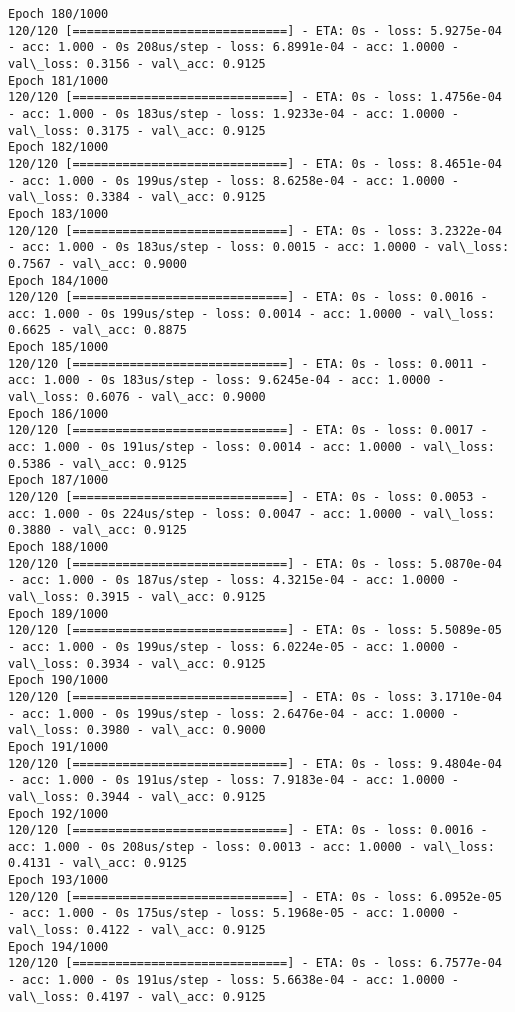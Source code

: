 \documentclass[11pt]{article}
\begin{document}
\begin{Verbatim}[commandchars=\\\{\}]
Epoch 180/1000
120/120 [==============================] - ETA: 0s - loss: 5.9275e-04 - acc: 1.000 - 0s 208us/step - loss: 6.8991e-04 - acc: 1.0000 - val\_loss: 0.3156 - val\_acc: 0.9125
Epoch 181/1000
120/120 [==============================] - ETA: 0s - loss: 1.4756e-04 - acc: 1.000 - 0s 183us/step - loss: 1.9233e-04 - acc: 1.0000 - val\_loss: 0.3175 - val\_acc: 0.9125
Epoch 182/1000
120/120 [==============================] - ETA: 0s - loss: 8.4651e-04 - acc: 1.000 - 0s 199us/step - loss: 8.6258e-04 - acc: 1.0000 - val\_loss: 0.3384 - val\_acc: 0.9125
Epoch 183/1000
120/120 [==============================] - ETA: 0s - loss: 3.2322e-04 - acc: 1.000 - 0s 183us/step - loss: 0.0015 - acc: 1.0000 - val\_loss: 0.7567 - val\_acc: 0.9000
Epoch 184/1000
120/120 [==============================] - ETA: 0s - loss: 0.0016 - acc: 1.000 - 0s 199us/step - loss: 0.0014 - acc: 1.0000 - val\_loss: 0.6625 - val\_acc: 0.8875
Epoch 185/1000
120/120 [==============================] - ETA: 0s - loss: 0.0011 - acc: 1.000 - 0s 183us/step - loss: 9.6245e-04 - acc: 1.0000 - val\_loss: 0.6076 - val\_acc: 0.9000
Epoch 186/1000
120/120 [==============================] - ETA: 0s - loss: 0.0017 - acc: 1.000 - 0s 191us/step - loss: 0.0014 - acc: 1.0000 - val\_loss: 0.5386 - val\_acc: 0.9125
Epoch 187/1000
120/120 [==============================] - ETA: 0s - loss: 0.0053 - acc: 1.000 - 0s 224us/step - loss: 0.0047 - acc: 1.0000 - val\_loss: 0.3880 - val\_acc: 0.9125
Epoch 188/1000
120/120 [==============================] - ETA: 0s - loss: 5.0870e-04 - acc: 1.000 - 0s 187us/step - loss: 4.3215e-04 - acc: 1.0000 - val\_loss: 0.3915 - val\_acc: 0.9125
Epoch 189/1000
120/120 [==============================] - ETA: 0s - loss: 5.5089e-05 - acc: 1.000 - 0s 199us/step - loss: 6.0224e-05 - acc: 1.0000 - val\_loss: 0.3934 - val\_acc: 0.9125
Epoch 190/1000
120/120 [==============================] - ETA: 0s - loss: 3.1710e-04 - acc: 1.000 - 0s 199us/step - loss: 2.6476e-04 - acc: 1.0000 - val\_loss: 0.3980 - val\_acc: 0.9000
Epoch 191/1000
120/120 [==============================] - ETA: 0s - loss: 9.4804e-04 - acc: 1.000 - 0s 191us/step - loss: 7.9183e-04 - acc: 1.0000 - val\_loss: 0.3944 - val\_acc: 0.9125
Epoch 192/1000
120/120 [==============================] - ETA: 0s - loss: 0.0016 - acc: 1.000 - 0s 208us/step - loss: 0.0013 - acc: 1.0000 - val\_loss: 0.4131 - val\_acc: 0.9125
Epoch 193/1000
120/120 [==============================] - ETA: 0s - loss: 6.0952e-05 - acc: 1.000 - 0s 175us/step - loss: 5.1968e-05 - acc: 1.0000 - val\_loss: 0.4122 - val\_acc: 0.9125
Epoch 194/1000
120/120 [==============================] - ETA: 0s - loss: 6.7577e-04 - acc: 1.000 - 0s 191us/step - loss: 5.6638e-04 - acc: 1.0000 - val\_loss: 0.4197 - val\_acc: 0.9125

\end{Verbatim}
\end{document}
